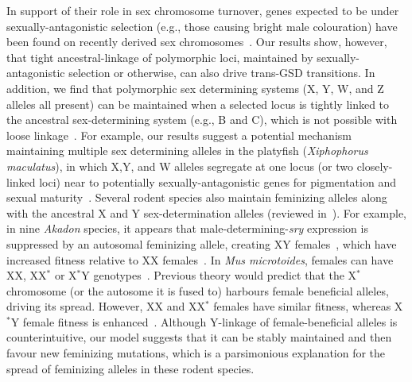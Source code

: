 \documentclass[10pt,letterpaper]{article}
\begin{document}
In support of their role in sex chromosome turnover, genes expected to be under sexually-antagonistic selection (e.g., those causing bright male colouration) have been found on recently derived sex chromosomes~\cite{Lindholm:2002dw,Tripathi:2009cw,Ser:2010iq}. 
Our results show, however, that tight ancestral-linkage of polymorphic loci, maintained by sexually-antagonistic selection or otherwise, can also drive trans-GSD transitions. 
In addition, we find that polymorphic sex determining systems (X, Y, W, and Z alleles all present) can be maintained when a selected locus is tightly linked to the ancestral sex-determining system (e.g., B and C), which is not possible with loose linkage~\cite{vanDoorn:2010hu}. 
For example, our results suggest a potential mechanism maintaining multiple sex determining alleles in the platyfish (\textit{Xiphophorus maculatus}), in which X,Y, and W alleles segregate at one locus (or two closely-linked loci) near to potentially sexually-antagonistic genes for pigmentation and sexual maturity~\cite{Kallman1965,Kallman1968, Volff2001, Schultheis2006}.
Several rodent species also maintain feminizing alleles along with the ancestral X and Y sex-determination alleles (reviewed in~\cite{Fredga1994}). 
For example, in nine \textit{Akadon} species, it appears that male-determining-\textit{sry} expression is suppressed by an autosomal feminizing allele, creating XY females~\cite{Bianchi2002,Sanchez2010}, which have increased fitness relative to XX females~\cite{Hoekstra2001}. 
In \textit{Mus microtoides}, females can have XX, XX$^\ast$ or X$^\ast$Y genotypes~\cite{Veyrunes2010}. 
Previous theory would predict that the X$^\ast$ chromosome (or the autosome it is fused to) harbours female beneficial alleles, driving its spread. 
However, XX and XX$^\ast$ females have similar fitness, whereas X$^\ast$Y female fitness is enhanced~\cite{Saunders2014,Saunders2016, Veyrunes2017}.
Although Y-linkage of female-beneficial alleles is counterintuitive, our model suggests that it can be stably maintained and then favour new feminizing mutations, which is a parsimonious explanation for the spread of feminizing alleles in these rodent species. 
\end{document}
